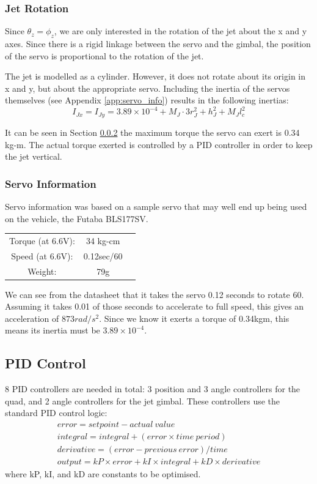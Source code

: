 \documentclass[11pt]{article}
\begin{document}
\subsubsection{Jet Rotation}
Since $\theta_z = \phi_z$, we are only interested in the rotation of the jet about the x and y axes. Since there is a rigid linkage between the servo and the gimbal, the position of the servo is proportional to the rotation of the jet.

The jet is modelled as a cylinder. However, it does not rotate about its origin in x and y, but about the appropriate servo. Including the inertia of the servos themselves (see Appendix \ref{app:servo_info}) results in the following inertias:
\begin{equation}
    I_{Jx} = I_{Jy} = 3.89\times10^{-4} + M_J\cdot3r_J^2 + h_J^2 + M_Jl_c^2
\end{equation}

It can be seen in Section \ref{sec:servo_info} the maximum torque the servo can exert is 0.34 kg-m. The actual torque exerted is controlled by a PID controller in order to keep the jet vertical.

\subsubsection{Servo Information}  \label{sec:servo_info}
Servo information was based on a sample servo that may well end up being used on the vehicle, the Futaba BLS177SV.

\begin{center}
\begin{tabular}{ccc}
    Torque (at 6.6V): & 34 kg-cm \\
    Speed (at 6.6V): & 0.12sec/60\textdegree{} \\
    Weight: & 79g \\
\end{tabular}
\end{center}

We can see from the datasheet that it takes the servo 0.12 seconds to rotate 60\textdegree{}. Assuming it takes 0.01 of those seconds to accelerate to full speed, this gives an acceleration of $873rad/s^2$. Since we know it exerts a torque of 0.34kgm, this means its inertia must be $3.89\times10^{-4}$.

\subsection{PID Control} \label{sec:PID_Control}
8 PID controllers are needed in total: 3 position and 3 angle controllers for the quad, and 2 angle controllers for the jet gimbal. These controllers use the standard PID control logic:
\begin{eqnarray*}
    error = setpoint - actual\ value \\
    integral = integral + (error \times time\ period) \\
    derivative = (error - previous\ error)/time \\
    output = kP \times error + kI \times integral + kD \times derivative
\end{eqnarray*}
where kP, kI, and kD are constants to be optimised.
\end{document}
